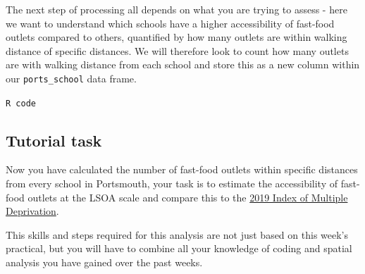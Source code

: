 \documentclass[
  letterpaper,
  DIV=11,
  numbers=noendperiod]{scrreprt}
\newenvironment{Shaded}{\begin{snugshade}}{\end{snugshade}}
\newcommand{\CommentTok}[1]{\textcolor[rgb]{0.37,0.37,0.37}{#1}}
\newcommand{\DecValTok}[1]{\textcolor[rgb]{0.68,0.00,0.00}{#1}}
\newcommand{\FunctionTok}[1]{\textcolor[rgb]{0.28,0.35,0.67}{#1}}
\newcommand{\NormalTok}[1]{\textcolor[rgb]{0.00,0.23,0.31}{#1}}
\newcommand{\OtherTok}[1]{\textcolor[rgb]{0.00,0.23,0.31}{#1}}
\newcommand{\SpecialCharTok}[1]{\textcolor[rgb]{0.37,0.37,0.37}{#1}}
\begin{document}
The next step of processing all depends on what you are trying to assess
- here we want to understand which schools have a higher accessibility
of fast-food outlets compared to others, quantified by how many outlets
are within walking distance of specific distances. We will therefore
look to count how many outlets are with walking distance from each
school and store this as a new column within our \texttt{ports\_school}
data frame.

\begin{codelisting}

\caption{\texttt{R code}}

\begin{Shaded}
\end{Shaded}

\end{codelisting}

\hypertarget{task-ntx}{%
\subsection{Tutorial task}\label{task-ntx}}

Now you have calculated the number of fast-food outlets within specific
distances from every school in Portsmouth, your task is to estimate the
accessibility of fast-food outlets at the LSOA scale and compare this to
the
\href{https://www.gov.uk/government/statistics/english-indices-of-deprivation-2019}{2019
Index of Multiple Deprivation}.

\begin{tcolorbox}[enhanced jigsaw, rightrule=.15mm, colback=white, opacityback=0, opacitybacktitle=0.6, coltitle=black, colbacktitle=quarto-callout-tip-color!10!white, breakable, arc=.35mm, title=\textcolor{quarto-callout-tip-color}{\faLightbulb}\hspace{0.5em}{Tip}, left=2mm, leftrule=.75mm, bottomtitle=1mm, toprule=.15mm, bottomrule=.15mm, colframe=quarto-callout-tip-color-frame, toptitle=1mm, titlerule=0mm]

This skills and steps required for this analysis are not just based on
this week's practical, but you will have to combine all your knowledge
of coding and spatial analysis you have gained over the past weeks.

\end{tcolorbox}
\end{document}
